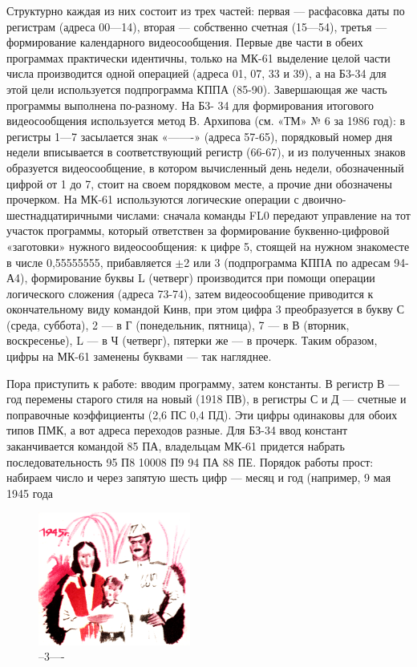 \documentclass[11pt,a4paper,oneside]{article}
\begin{document}
Структурно каждая из них состоит из трех частей: первая — расфасовка даты по регистрам (адреса 00—14), вторая — собственно счетная (15—54), третья — формирование календарного видеосообщения. Первые две части в обеих программах практически идентичны, только на МК-61 выделение целой части числа производится одной операцией (адреса 01, 07, 33 и 39), а на Б3-34 для этой цели используется подпрограмма КППА (85-90). Завершающая же часть программы выполнена по-разному. На Б3- 34 для формирования итогового видеосообщения используется метод В. Архипова (см. «ТМ» № 6 за 1986 год): в регистры 1—7 засылается знак «-------» (адреса 57-65), порядковый номер дня недели вписывается в соответствующий регистр (66-67), и из полученных знаков образуется видеосообщение, в котором вычисленный день недели, обозначенный цифрой от 1 до 7, стоит на своем порядковом месте, а прочие дни обозначены прочерком. На МК-61 используются логические операции с двоично-шестнадцатиричными числами: сначала команды FL0 передают управление на тот участок программы, который ответствен за формирование буквенно-цифровой «заготовки» нужного видеосообщения: к цифре 5, стоящей на нужном знакоместе в числе 0,55555555, прибавляется $\pm$2 или 3 (подпрограмма КППА по адресам 94-А4), формирование буквы L (четверг) производится при помощи операции логического сложения (адреса 73-74), затем видеосообщение приводится к окончательному виду командой Кинв, при этом цифра 3 преобразуется в букву С (среда, суббота), 2 — в Г (понедельник, пятница), 7 — в В (вторник, воскресенье), L — в Ч (четверг), пятерки же — в прочерк. Таким образом, цифры на МК-61 заменены буквами — так нагляднее.

Пора приступить к работе: вводим программу, затем константы. В регистр В — год перемены старого стиля на новый (1918 ПВ), в регистры С и Д — счетные и поправочные коэффициенты (2,6 ПС 0,4 ПД). Эти цифры одинаковы для обоих типов ПМК, а вот адреса переходов разные. Для БЗ-34 ввод констант заканчивается командой 85 ПА, владельцам МК-61 придется набрать последовательность 95 П8 10008 П9 94 ПА 88 ПЕ. Порядок работы прост: набираем число и через запятую шесть цифр — месяц и год (например, 9 мая 1945 года

\begin{figure}[H]
\includegraphics[width=5cm]{cal1}
\caption{--3----}
\end{figure}
\end{document}
